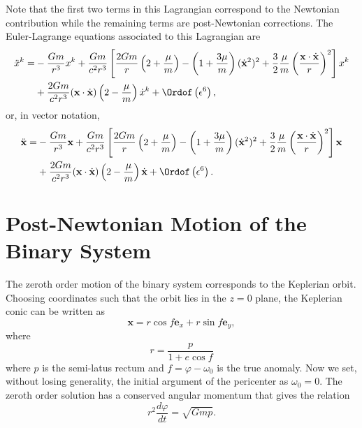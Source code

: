 Note that the first two terms in this Lagrangian correspond to the Newtonian contribution while the remaining terms are post-Newtonian corrections. The Euler-Lagrange equations associated to this Lagrangian are
\begin{align}
\ddot{x} ^k = &-\frac{Gm}{r^3} x^k + \frac{Gm}{c^2 r^3} \left[  \frac{2Gm}{r} \left( 2 + \frac{\mu }{m} \right) - \left( 1 + \frac{3\mu }{m} \right) (\dot{\textbf{x}}^2)^2 + \frac{3}{2} \frac{\mu }{m} \left( \frac{\textbf{x} \cdot \dot{\textbf{x}}}{r} \right)^2   \right] x^k \notag \\
& + \frac{2Gm}{c^2 r^3} (\textbf{x} \cdot \dot{\textbf{x}}) \left( 2 - \frac{\mu }{m} \right) \dot{x}^k  + \Ordof \left( \epsilon^6 \right), 
\end{align}
or, in vector notation, 
\begin{align}
\ddot{\textbf{x}} = &-\frac{Gm}{r^3} \textbf{x} + \frac{Gm}{c^2 r^3} \left[  \frac{2Gm}{r} \left( 2 + \frac{\mu }{m} \right) - \left( 1 + \frac{3\mu }{m} \right) (\dot{\textbf{x}}^2)^2 + \frac{3}{2} \frac{\mu }{m} \left( \frac{\textbf{x} \cdot \dot{\textbf{x}}}{r} \right)^2   \right] \textbf{x} \notag \\
& + \frac{2Gm}{c^2 r^3} (\textbf{x} \cdot \dot{\textbf{x}}) \left( 2 - \frac{\mu }{m} \right) \dot{\textbf{x}} + \Ordof \left( \epsilon^6 \right). \label{eq:PNBinaryRelativeAcc}
\end{align}

\section{Post-Newtonian Motion of the Binary System}

The zeroth order motion of the binary system corresponds to the Keplerian orbit. Choosing coordinates such that the orbit  lies in the $z=0$ plane, the Keplerian conic can be written as
\begin{equation}
\textbf{x} = r \cos f \textbf{e}_x + r \sin f \textbf{e}_y , \label{eq:PNBinaryRelativePosition}
\end{equation}
where
\begin{equation}
r = \frac{p}{1+e \cos f} \label{eq:PNBinaryRadius}
\end{equation}
where $p$ is the semi-latus rectum and $f=\varphi - \omega_0$ is the true anomaly. Now we set, without losing generality, the initial argument of the pericenter as $\omega_0 =0$. The zeroth order solution has a conserved angular momentum that gives the relation
\begin{equation}
r^2 \frac{d\varphi}{dt} = \sqrt{Gmp}.
\end{equation}

